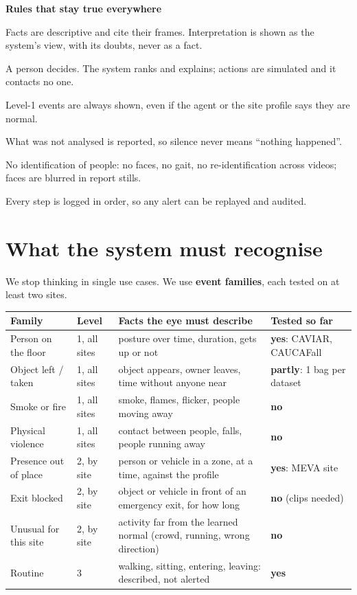 \documentclass[11pt,a4paper]{article}
\newcommand{\ok}[1]{\textcolor{okc}{\textbf{#1}}}
\newcommand{\wip}[1]{\textcolor{wipc}{\textbf{#1}}}
\newcommand{\bad}[1]{\textcolor{badc}{\textbf{#1}}}
\begin{document}
\begin{rulebox}
\textbf{Rules that stay true everywhere}
\begin{description}[leftmargin=2.2em,labelwidth=1.8em,font=\bfseries\color{accent}]
\item[R1.] Facts are descriptive and cite their frames. Interpretation is shown as the system's view, with
its doubts, never as a fact.
\item[R2.] A person decides. The system ranks and explains; actions are simulated and it contacts no one.
\item[R3.] Level-1 events are always shown, even if the agent or the site profile says they are normal.
\item[R4.] What was not analysed is reported, so silence never means ``nothing happened''.
\item[R5.] No identification of people: no faces, no gait, no re-identification across videos; faces are blurred
in report stills.
\item[R6.] Every step is logged in order, so any alert can be replayed and audited.
\end{description}
\end{rulebox}

\section{What the system must recognise}
We stop thinking in single use cases. We use \textbf{event families}, each tested on at least two sites.

\begin{center}
\small
\begin{tabularx}{\textwidth}{L{3.3cm}L{2.0cm}YL{2.6cm}}
\toprule
\textbf{Family} & \textbf{Level} & \textbf{Facts the eye must describe} & \textbf{Tested so far}\\
\midrule
Person on the floor & 1, all sites & posture over time, duration, gets up or not & \ok{yes}: CAVIAR, CAUCAFall\\
Object left / taken & 1, all sites & object appears, owner leaves, time without anyone near & \wip{partly}: 1 bag per dataset\\
Smoke or fire & 1, all sites & smoke, flames, flicker, people moving away & \bad{no}\\
Physical violence & 1, all sites & contact between people, falls, people running away & \bad{no}\\
Presence out of place & 2, by site & person or vehicle in a zone, at a time, against the profile & \ok{yes}: MEVA site\\
Exit blocked & 2, by site & object or vehicle in front of an emergency exit, for how long & \bad{no} (clips needed)\\
Unusual for this site & 2, by site & activity far from the learned normal (crowd, running, wrong direction) & \bad{no}\\
Routine & 3 & walking, sitting, entering, leaving: described, not alerted & \ok{yes}\\
\bottomrule
\end{tabularx}
\end{center}
\end{document}
